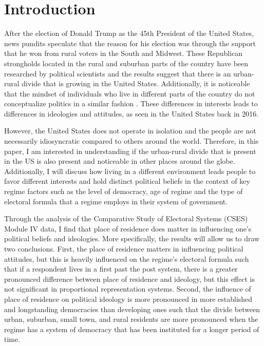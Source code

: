 \documentclass[12pt, titlepage]{article}
\begin{document}
\listoftables
\clearpage

\listoffigures
\clearpage

\section{Introduction}

After the election of Donald Trump as the 45th President of the United States, news pundits speculate that the reason for his election was through the support that he won from rural voters in the South and Midwest. These Republican strongholds located in the rural and suburban parts of the country have been researched by political scientists \citep{walsh_putting_2012} and the results suggest that there is an urban-rural divide that is growing in the United States. Additionally, it is noticeable that the mindset of individuals who live in different parts of the country do not conceptualize politics in a similar fashion \citep{holloway_burning_2007}. These differences in interests leads to differences in ideologies and attitudes, as seen in the United States back in 2016.

However, the United States does not operate in isolation and the people are not necessarily idiosyncratic compared to others around the world. Therefore, in this paper, I am interested in understanding if the urban-rural divide that is present in the US is also present and noticeable in other places around the globe. Additionally, I  will discuss how living in a different environment leads people to favor different interests and hold distinct political beliefs in the context of key regime factors such as the level of democracy, age of regime and the type of electoral formula that a regime employs in their system of government.
 
Through the analysis of the Comparative Study of Electoral Systems (CSES) Module IV data, I find that place of residence does matter in influencing one's political beliefs and ideologies. More specifically, the results will allow us to draw two conclusions. First, the place of residence matters in influencing political attitudes, but this is heavily influenced on the regime's electoral formula such that if a respondent lives in a first past the post system, there is a greater pronounced difference between place of residence and ideology, but this effect is not significant in proportional representation systems. Second, the influence of place of residence on political ideology is more pronounced in more established and longstanding democracies than developing ones such that the divide between urban, suburban, small town, and rural residents are more pronounced when the regime has a system of democracy that has been instituted for a longer period of time.
 
\end{document}
